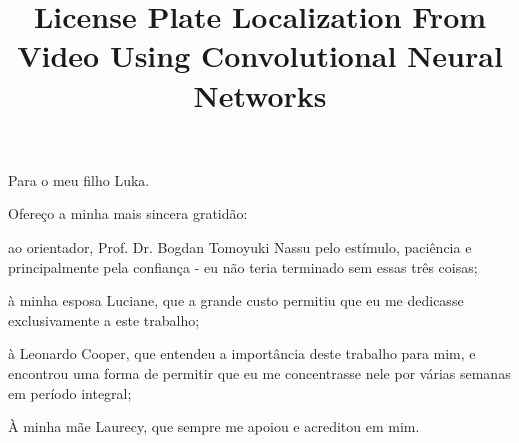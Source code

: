\documentclass[oneside,a4paper,12pt]{normas-utf-tex}
\title{License Plate Localization From Video Using Convolutional Neural Networks}
\begin{document}

\capa

\folhaderosto


\begin{dedicatoria}
	Para o meu filho Luka.
\end{dedicatoria}

\begin{agradecimentos}
	Ofereço a minha mais sincera gratidão:

	ao orientador, Prof. Dr. Bogdan Tomoyuki Nassu pelo estímulo,
	paciência e principalmente pela confiança - eu não teria terminado
	sem essas três coisas;

	à minha esposa Luciane, que a grande custo permitiu que eu me
	dedicasse exclusivamente a este trabalho;

	à Leonardo Cooper, que entendeu a importância deste trabalho
	para mim, e encontrou uma forma de permitir que eu me concentrasse
	nele por várias semanas em período integral;

	À minha mãe Laurecy, que sempre me apoiou e acreditou em mim.
\end{agradecimentos}

\begin{resumo}
	
\end{resumo}

\begin{abstract}
	
\end{abstract}


\listadefiguras
\listadetabelas
\listadesiglas

\sumario






%
%

%
%
\end{document}
